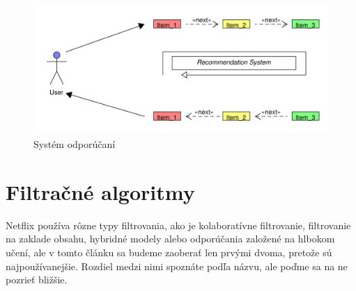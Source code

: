 \documentclass[10pt,slovak,a4paper]{article}
\begin{document}
\begin{figure}[H]
  \centering
  \includegraphics[width=1\textwidth]{Images_tables/RecommendationSystem_pdf.pdf}
  \caption{Systém odporúčaní}
\end{figure}

\section{Filtračné algoritmy}

Netflix používa rôzne typy filtrovania, ako je kolaboratívne filtrovanie, filtrovanie na zaklade obsahu\cite{Filtracne:algoritmy}, hybridné modely alebo odporúčania založené na hlbokom učení, ale v tomto článku sa budeme zaoberať len prvými dvoma, pretože sú najpoužívanejšie. 
Rozdiel medzi nimi spoznáte podľa názvu, ale poďme sa na ne pozrieť bližšie.
\end{document}
